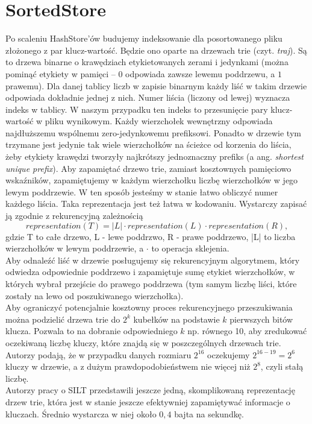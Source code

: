 \documentclass[declaration,shortabstract,masc]{iithesis}
\begin{document}
		\section{SortedStore}
			Po scaleniu HashStore'ów budujemy indeksowanie dla posortowanego pliku złożonego z par klucz-wartość. Będzie ono oparte na drzewach trie (czyt. \textit{traj}). Są to drzewa binarne o krawędziach etykietowanych zerami i jedynkami (można pominąć etykiety w pamięci -- $0$ odpowiada zawsze lewemu poddrzewu, a $1$ prawemu). Dla danej tablicy liczb w zapisie binarnym każdy liść w takim drzewie odpowiada dokładnie jednej z nich. Numer liścia (liczony od lewej) wyznacza indeks w tablicy. W naszym przypadku ten indeks to przesunięcie pary klucz-wartość w pliku wynikowym. Każdy wierzchołek wewnętrzny odpowiada najdłuższemu wspólnemu zero-jedynkowemu prefiksowi. Ponadto w drzewie tym trzymane jest jedynie tak wiele wierzchołków na ścieżce od korzenia do liścia, żeby etykiety krawędzi tworzyły najkrótszy jednoznaczny prefiks (a ang. \textit{shortest unique prefix}). Aby zapamiętać drzewo trie, zamiast kosztownych pamięciowo wskaźników, zapamiętujemy w każdym wierzchołku liczbę wierzchołków w jego lewym poddrzewie. W ten sposób jesteśmy w stanie łatwo obliczyć numer każdego liścia. Taka reprezentacja jest też łatwa w kodowaniu. Wystarczy zapisać ją zgodnie z rekurencyjną zależnością
			$$representation\left(T\right) = |L| \cdot representation\left(L\right) \cdot representation\left(R\right),$$
			gdzie T to całe drzewo, L - lewe poddrzwo, R - prawe poddrzewo, |L| to liczba wierzchołków w lewym poddrzewie, a $\cdot$ to operacja sklejenia.\\
			\indent Aby odnaleźć liść w drzewie posługujemy się rekurencyjnym algorytmem, który odwiedza odpowiednie poddrzewo i zapamiętuje sumę etykiet wierzchołków, w których wybrał przejście do prawego poddrzewa (tym samym liczbę liści, które zostały na lewo od poszukiwanego wierzchołka).\\
			\indent Aby ograniczyć potencjalnie kosztowny proces rekurencyjnego przeszukiwania można podzielić drzewa trie do $2^k$ kubełków na podstawie $k$ pierwszych bitów klucza. Pozwala to na dobranie odpowiedniego $k$ np. równego 10, aby zredukować oczekiwaną liczbę kluczy, które znajdą się w poszczególnych drzewach trie. Autorzy podają, że w przypadku danych rozmiaru $2^16$ oczekujemy $2^{16-19} = 2^6$ kluczy w drzewie, a z dużym prawdopodobieństwem nie więcej niż $2^8$, czyli stałą liczbę.\\
			\indent Autorzy pracy o SILT przedstawili jeszcze jedną, skomplikowaną reprezentację drzew trie, która jest w stanie jeszcze efektywniej zapamiętywać informacje o kluczach. Średnio wystarcza w niej około $0,4$ bajta na sekundkę.
\end{document}
